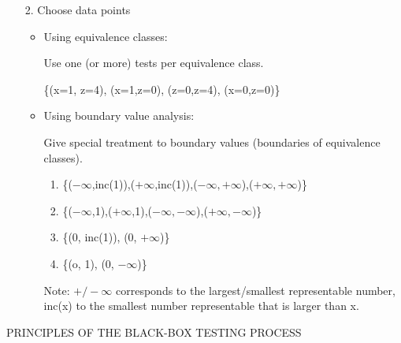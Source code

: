 \begin{enumerate}

\item[2.] Choose data points

\begin{itemize}
\item Using equivalence classes:

Use one (or more) tests per equivalence class.

\{(x=1, z=4), (x=1,z=0), (z=0,z=4), (x=0,z=0)\}

\item Using boundary value analysis:

Give special treatment to boundary values (boundaries
of equivalence classes).

\begin{enumerate}
\item \{($-\infty$,inc(1)),($+\infty$,inc(1)),($-\infty,+\infty$),($+\infty,+\infty$)\}
\item \{($-\infty$,1),($+\infty$,1),($-\infty,-\infty$),($+\infty,-\infty$)\}
\item \{(0, inc(1)), (0, $+\infty$)\}
\item \{(o, 1), (0, $-\infty$)\}

\end{enumerate}

Note: $+/-\infty$ corresponds to the largest/smallest representable number, 
inc(x) to the smallest number representable that is larger than x.


\end{itemize}

\end{enumerate}


\newpage
\centerline{PRINCIPLES OF THE BLACK-BOX TESTING PROCESS}
\bigskip

